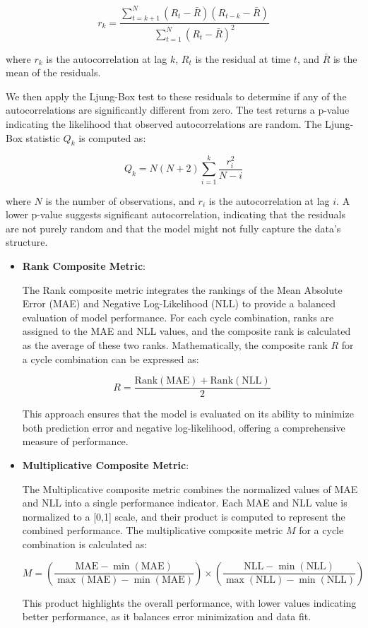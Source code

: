 \documentclass{article}
\begin{document}
\begin{itemize}
  \[
  r_k = \frac{\sum_{t=k+1}^{N} (R_t - \bar{R})(R_{t-k} - \bar{R})}{\sum_{t=1}^{N} (R_t - \bar{R})^2}
  \]

  where \(r_k\) is the autocorrelation at lag \(k\), \(R_t\) is the residual at time \(t\), and \(\bar{R}\) is the mean of the residuals.

  We then apply the Ljung-Box test to these residuals to determine if any of the autocorrelations are significantly different from zero. The test returns a p-value indicating the likelihood that observed autocorrelations are random. The Ljung-Box statistic \(Q_k\) is computed as:

  \[
  Q_k = N(N+2) \sum_{i=1}^{k} \frac{r_i^2}{N-i}
  \]

  where \(N\) is the number of observations, and \(r_i\) is the autocorrelation at lag \(i\). A lower p-value suggests significant autocorrelation, indicating that the residuals are not purely random and that the model might not fully capture the data's structure.
\end{itemize}


\begin{itemize}
  \item \textbf{Rank Composite Metric}:

  The Rank composite metric integrates the rankings of the Mean Absolute Error (MAE) and Negative Log-Likelihood (NLL) to provide a balanced evaluation of model performance. For each cycle combination, ranks are assigned to the MAE and NLL values, and the composite rank is calculated as the average of these two ranks. Mathematically, the composite rank \( R \) for a cycle combination can be expressed as:

  \[
  R = \frac{\text{Rank}(\text{MAE}) + \text{Rank}(\text{NLL})}{2}
  \]

  This approach ensures that the model is evaluated on its ability to minimize both prediction error and negative log-likelihood, offering a comprehensive measure of performance.
  
  \item \textbf{Multiplicative Composite Metric}:

  The Multiplicative composite metric combines the normalized values of MAE and NLL into a single performance indicator. Each MAE and NLL value is normalized to a [0,1] scale, and their product is computed to represent the combined performance. The multiplicative composite metric \( M \) for a cycle combination is calculated as:

  \[
  M = \left( \frac{\text{MAE} - \min(\text{MAE})}{\max(\text{MAE}) - \min(\text{MAE})} \right) \times \left( \frac{\text{NLL} - \min(\text{NLL})}{\max(\text{NLL}) - \min(\text{NLL})} \right)
  \]

  This product highlights the overall performance, with lower values indicating better performance, as it balances error minimization and data fit.
\end{itemize}
\end{document}
